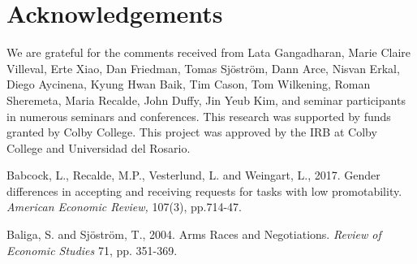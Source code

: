 \documentclass[12pt, letterpaper]{article}
\theoremstyle{plain}
\begin{document}
\section{Acknowledgements}
We are grateful for the comments received from Lata Gangadharan, Marie Claire Villeval, Erte Xiao, Dan Friedman, Tomas Sj\"ostr\"om, Dann Arce, Nisvan Erkal, Diego Aycinena, Kyung Hwan Baik, Tim Cason, Tom Wilkening, Roman Sheremeta, Maria Recalde, John Duffy, Jin Yeub Kim, and seminar participants in numerous seminars and conferences. This research was supported by funds granted by Colby College. This project was approved by the IRB at Colby College and Universidad del Rosario.

\newpage
\begin{thebibliography}{10}




\bibitem{} Babcock, L., Recalde, M.P., Vesterlund, L. and Weingart, L., 2017. Gender differences in accepting and receiving requests for tasks with low promotability. \textit{American Economic Review,} 107(3), pp.714-47.


  Baliga, S. and Sj\"ostr\"om, T., 2004. Arms Races and Negotiations. \textit{Review of Economic Studies} 71, pp. 351-369.







\end{thebibliography}
\end{document}
